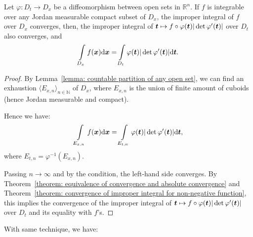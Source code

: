 \documentclass[openany]{book}
\begin{document}
\begin{theorem}
	\label{theorem: change of variables for diffeomorphism (improper integrals)}
	Let $\varphi \colon D_t \to D_x$ be a diffeomorphism between open sets in $\mathbb R^n$.
	If $f$ is integrable over any Jordan measurable compact subset of $D_x$, the improper integral of $f$ over $D_x$ converges, then, the improper integral of $\boldsymbol{t} \mapsto f \circ \varphi(\boldsymbol{t}) |\det \varphi'(\boldsymbol{t})|$ over $D_t$ also converges, and
	\begin{equation*}
		\int\limits_{D_x} f(\boldsymbol{x}) \mathrm{d} \boldsymbol{x} = \int\limits_{D_t} \varphi(\boldsymbol{t}) |\det \varphi'(\boldsymbol{t})| \mathrm{d} \boldsymbol{t}.
	\end{equation*}
\end{theorem}
\begin{proof}
	By Lemma~\ref{lemma: countable partition of any open set}, we can find an exhaustion $\langle E_{x, n}\rangle_{n \in \mathbb N}$ of $D_x$, where $E_{x, n}$ is the union of finite amount of cuboids (hence Jordan measurable and compact). 

	Hence we have:
	\begin{equation*}
		\int\limits_{E_{x, n}} f(\boldsymbol{x}) \mathrm{d} \boldsymbol{x} = \int\limits_{E_{t, n}} \varphi(\boldsymbol{t}) |\det \varphi'(\boldsymbol{t})| \mathrm{d} \boldsymbol{t},
	\end{equation*}
	where $E_{t, n} = \varphi^{-1}(E_{x, n})$.

	Passing $n \to \infty$ and by the condition, the left-hand side converges. 
	By Theorem~\ref{theorem: equivalence of convergence and absolute convergence} and Theorem~\ref{theorem: convergence of improper integral for non-negative function}, this implies the convergence of the improper integral of $\boldsymbol{t} \mapsto f \circ \varphi(\boldsymbol{t}) |\det \varphi'(\boldsymbol{t})|$ over $D_t$ and its equality with $f$'s.
\end{proof}

With same technique, we have:
\end{document}

